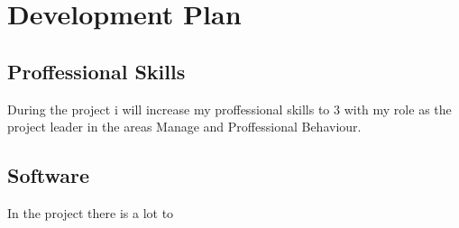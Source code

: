 \section{Development Plan}
\label{sec:development}

\subsection{Proffessional Skills}
During the project i will increase my proffessional skills to 3 with my role as the
project leader in the areas Manage and Proffessional Behaviour.

\subsection{Software}
In the project there is a lot to 
